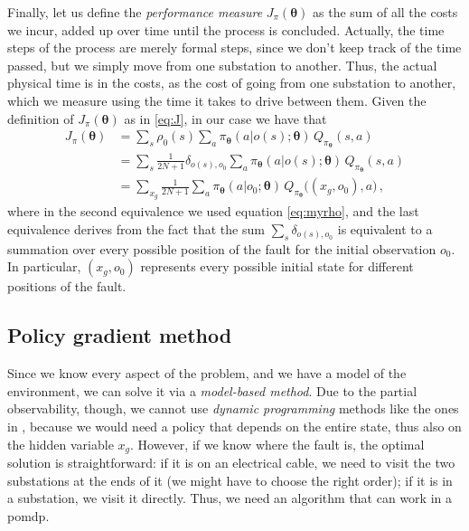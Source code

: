 Finally, let us define the \emph{performance measure} $J_\pi(\boldsymbol \theta)$ as the sum of all the costs we incur, added up over time until the process is concluded. Actually, the time steps of the process are merely formal steps, since we don't keep track of the time passed, but we simply move from one substation to another. Thus, the actual physical time is in the costs, as the cost of going from one substation to another, which we measure using the time it takes to drive between them. Given the definition of $J_\pi(\boldsymbol \theta)$ as in \eqref{eq:J}, in our case we have that
\begin{equation}
    \begin{aligned}
        J_\pi(\boldsymbol \theta) 
        &= \sum_s \rho_0(s) \sum_a \pi_{\boldsymbol \theta} (a|o(s); \boldsymbol \theta) \, Q_{\pi_{\boldsymbol \theta}}(s,a) \\
        &= \sum_{s} \frac{1}{2N+1} \delta_{o(s), o_0} \sum_a \pi_{\boldsymbol \theta} (a|o(s); \boldsymbol \theta) \, Q_{\pi_{\boldsymbol \theta}}(s,a) \\
        &=  \sum_{x_g} \frac{1}{2N+1} \sum_a \pi_{\boldsymbol \theta} (a|o_0; \boldsymbol \theta) \, Q_{\pi_{\boldsymbol \theta}} \big( (x_g, o_0),a \big) \, ,
    \end{aligned}
    \label{eq:myJ}
\end{equation}
where in the second equivalence we used equation \eqref{eq:myrho}, and the last equivalence derives from the fact that the sum $\sum_s \delta_{o(s), o_0}$ is equivalent to a summation over every possible position of the fault for the initial observation $o_0$. In particular, $(x_g, o_0)$ represents every possible initial state for different positions of the fault.


\subsection{Policy gradient method}

Since we know every aspect of the problem, and we have a model of the environment, we can solve it via a \emph{model-based method}. Due to the partial observability, though, we cannot use \emph{dynamic programming} methods like the ones in \cite{BellmanDP}, because we would need a policy that depends on the entire state, thus also on the hidden variable $x_g$. However, if we know where the fault is, the optimal solution is straightforward: if it is on an electrical cable, we need to visit the two substations at the ends of it (we might have to choose the right order); if it is in a substation, we visit it directly. Thus, we need an algorithm that can work in a \acrshort{pomdp}.

